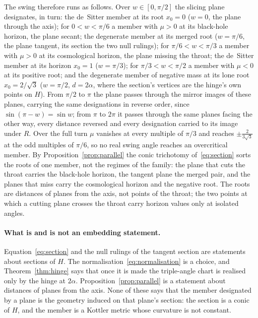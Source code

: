 \documentclass[11pt]{article}
\theoremstyle{plain}
\theoremstyle{definition}
\theoremstyle{remark}
\begin{document}
The swing therefore runs as follows. Over $w\in[0,\pi/2]$ the slicing plane designates, in turn: the de~Sitter
member at its root $x_{0}=0$ ($w=0$, the plane through the axis); for $0<w<\pi/6$ a member with $\mu>0$ at its
black-hole horizon, the plane secant; the degenerate member at its merged root ($w=\pi/6$, the plane tangent, its
section the two null rulings); for $\pi/6<w<\pi/3$ a member with $\mu>0$ at its cosmological horizon, the plane
missing the throat; the de~Sitter member at its horizon $x_{0}=1$ ($w=\pi/3$); for $\pi/3<w<\pi/2$ a member with
$\mu<0$ at its positive root; and the degenerate member of negative mass at its lone root $x_{0}=2/\sqrt3$
($w=\pi/2$, $d=2\alpha$, where the section's vertices are the hinge's own points on $H$). From $\pi/2$ to $\pi$ the
plane passes through the mirror images of these planes, carrying the same designations in reverse order, since
$\sin(\pi-w)=\sin w$; from $\pi$ to $2\pi$ it passes through the same planes facing the other way, every distance
reversed and every designation carried to its image under $R$. Over the full turn $\mu$ vanishes at every multiple
of $\pi/3$ and reaches $\pm\tfrac{2}{3\sqrt3}$ at the odd multiples of $\pi/6$, so no real swing angle reaches an
overcritical member. By Proposition~\ref{prop:parallel} the conic trichotomy of~\eqref{eq:section} sorts the roots
of one member, not the regimes of the family: the plane that cuts the throat carries the black-hole horizon, the
tangent plane the merged pair, and the planes that miss carry the cosmological horizon and the negative root. The
roots are distances of planes from the axis, not points of the throat; the two points at which a cutting plane
crosses the throat carry horizon values only at isolated angles.

\paragraph{What is and is not an embedding statement.} Equation~\eqref{eq:section} and the null rulings of the
tangent section are statements about sections of $H$. The normalisation~\eqref{eq:normalisation} is a choice,
and Theorem~\ref{thm:hinge} says that once it is made the triple-angle chart is realised only by the hinge at
$2\alpha$. Proposition~\ref{prop:parallel} is a statement about distances of planes from the axis. None of these says that
the member designated by a plane is the geometry induced on that plane's section:
the section is a conic of $H$, and the member is a Kottler metric whose curvature is not constant.
\end{document}
